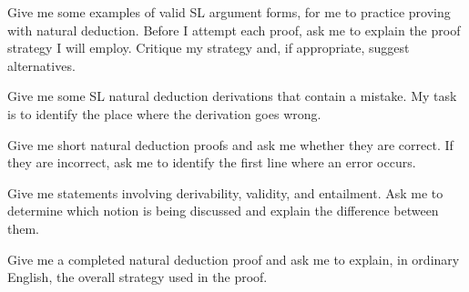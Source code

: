 \begin{genaipractice}[]
\item Give me some examples of valid SL argument forms, for me to practice proving with natural deduction. Before I attempt each proof, ask me to explain the proof strategy I will employ. Critique my strategy and, if appropriate, suggest alternatives.
\item Give me some SL natural deduction derivations that contain a mistake. My task is to identify the place where the derivation goes wrong.
\item Give me short natural deduction proofs and ask me whether they are correct. If they are incorrect, ask me to identify the first line where an error occurs.
\item Give me statements involving derivability, validity, and entailment. Ask me to determine which notion is being discussed and explain the difference between them.
\item Give me a completed natural deduction proof and ask me to explain, in ordinary English, the overall strategy used in the proof.

\end{genaipractice}
